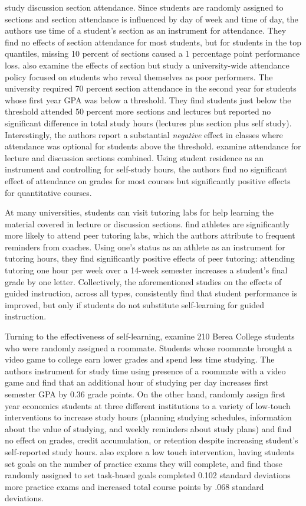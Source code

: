 \documentclass[12pt]{article}
\begin{document}
\textcite{ans2012} study discussion section attendance. Since students are randomly assigned to sections and section attendance is influenced by day of week and time of day, the authors use time of a student's section as an instrument for attendance. They find no effects of section attendance for most students, but for students in the top quantiles, missing 10 percent of sections caused a 1 percentage point performance loss. \textcite{kow2020} also examine the effects of section but study a university-wide attendance policy focused on students who reveal themselves as poor performers. The university required 70 percent section attendance in the second year for students whose first year GPA was below a threshold. They find students just below the threshold attended 50 percent more sections and lectures but reported no significant difference in total study hours (lectures plus section plus self study). Interestingly, the authors report a substantial \textit{negative} effect in classes where attendance was optional for students above the threshold. \textcite{bs2013} examine attendance for lecture and discussion sections combined. Using student residence as an instrument and controlling for self-study hours, the authors find no significant effect of attendance on grades for most courses but significantly positive effects for quantitative courses.

At many universities, students can visit tutoring labs for help learning the material covered in lecture or discussion sections. \textcite{mgm2010} find athletes are significantly more likely to attend peer tutoring labs, which the authors attribute to frequent reminders from coaches. Using one's status as an athlete as an instrument for tutoring hours, they find significantly positive effects of peer tutoring: attending tutoring one hour per week over a 14-week semester increases a student's final grade by one letter. Collectively, the aforementioned studies on the effects of guided instruction, across all types, consistently find that student performance is improved, but only if students do not substitute self-learning for guided instruction.

Turning to the effectiveness of self-learning, \textcite{ss2008} examine 210 Berea College students who were randomly assigned a roommate. Students whose roommate brought a video game to college earn lower grades and spend less time studying. The authors instrument for study time using presence of a roommate with a video game and find that an additional hour of studying per day increases first semester GPA by 0.36 grade points. On the other hand, \textcite{oppp2019} randomly assign first year economics students at three different institutions to a variety of low-touch interventions to increase study hours (planning studying schedules, information about the value of studying, and weekly reminders about study plans) and find no effect on grades, credit accumulation, or retention despite increasing student's self-reported study hours. \textcite{cgpr2020} also explore a low touch intervention, having students set goals on the number of practice exams they will complete, and find those randomly assigned to set task-based goals completed 0.102 standard deviations more practice exams and increased total course points by .068 standard deviations.
\end{document}
